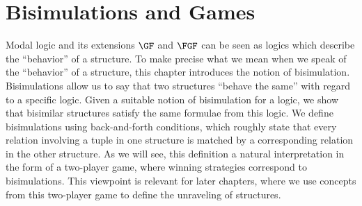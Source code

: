 \chapter{Bisimulations and Games}
Modal logic and its extensions $\GF$ and $\FGF$ can be seen as logics which describe the ``behavior'' of a structure.
To make precise what we mean when we speak of the ``behavior'' of a structure, this chapter introduces the notion of bisimulation.
Bisimulations allow us to say that two structures ``behave the same'' with regard to a specific logic.
Given a suitable notion of bisimulation for a logic, we show that bisimilar structures satisfy the same formulae from this logic.
We define bisimulations using back-and-forth conditions, which roughly state that every relation involving a tuple in one structure is matched by a corresponding relation in the other structure.
As we will see, this definition a natural interpretation in the form of a two-player game, where winning strategies correspond to bisimulations.
This viewpoint is relevant for later chapters, where we use concepts from this two-player game to define the unraveling of structures.


